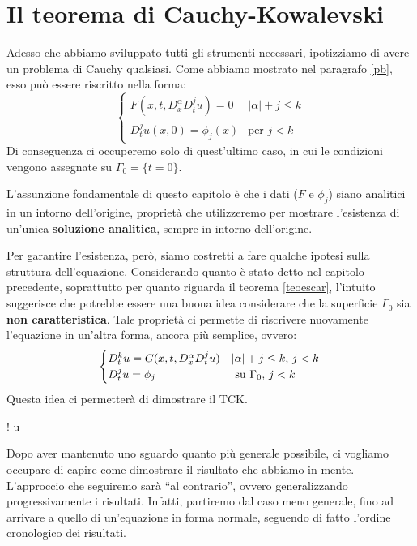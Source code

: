 \chapter{Il teorema di Cauchy-Kowalevski} \label{invariant}

Adesso che abbiamo sviluppato tutti gli strumenti necessari, ipotizziamo di avere un problema di Cauchy qualsiasi. Come abbiamo mostrato nel paragrafo \ref{pb}, esso può essere riscritto nella forma:
$$
\begin{cases}
F(x,t, D^\alpha_x D^j_t u)=0 & |\alpha | +j \leq k\\
D^j_t u (x,0)= \phi_j(x) & \text{per }j<k 
\end{cases}
$$
Di conseguenza ci occuperemo solo di quest'ultimo caso, in cui le condizioni vengono assegnate su $\Gamma_0=\{ t=0 \}$.

L'assunzione fondamentale di questo capitolo è che i dati ($F$ e $\phi_j$) siano analitici in un intorno dell'origine, proprietà che utilizzeremo per mostrare l'esistenza di un'unica \textbf{soluzione analitica}, sempre in intorno dell'origine.

Per garantire l'esistenza, però, siamo costretti a fare qualche ipotesi sulla struttura dell'equazione. 
Considerando quanto è stato detto nel capitolo precedente, soprattutto per quanto riguarda il teorema \ref{teoescar}, l'intuito suggerisce che potrebbe essere una buona idea considerare che la superficie $\Gamma_0$ sia \textbf{non caratteristica}. 
Tale proprietà ci permette di riscrivere nuovamente l'equazione in un'altra forma, ancora più semplice, ovvero:
\begin{equation}\label{pbnorm}
\begin{cases}
D_{t}^k u = G(x,t, D^\alpha_x D^j_t u) & |\alpha |+ j \leq k, \, j<k \\
D_t^ju = \phi_j & \text{ su } \Gamma_0, \, j<k
\end{cases} \\
\end{equation}
Questa idea ci permetterà di dimostrare il TCK.
\begin{namedtheorem}
{\exists ! \; u }
\end{namedtheorem}


Dopo aver mantenuto uno sguardo quanto più generale possibile, ci vogliamo occupare di capire come dimostrare il risultato che abbiamo in mente. L'approccio che seguiremo sarà ``al contrario'', ovvero generalizzando progressivamente i risultati. Infatti, partiremo dal caso meno generale, fino ad arrivare a quello di un'equazione in forma normale, seguendo di fatto l'ordine cronologico dei risultati.




